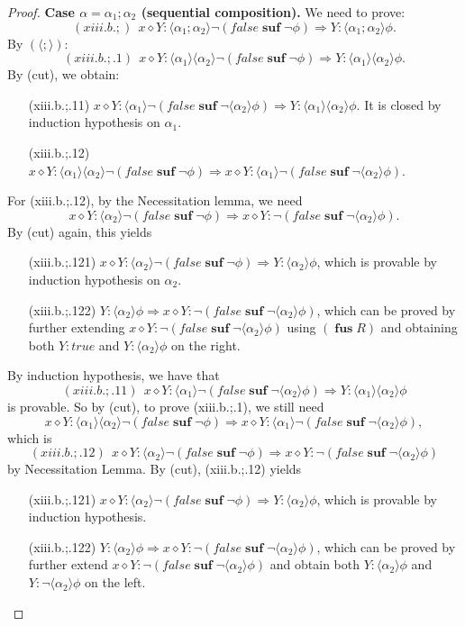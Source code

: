 \documentclass[manuscript,screen]{acmart}
\newcommand{\la}[0]{\langle}
\newcommand{\ra}[0]{\rangle}
\newcommand{\true}[0]{\mathit{true}}
\newcommand{\false}[0]{\mathit{false}}
\DeclareMathOperator{\seq}{;}
\newcommand{\cat}[0]{\diamond}
\DeclareMathOperator{\osuf}{\mathbf{suf}}
\DeclareMathOperator{\ofus}{\mathbf{fus}}
\begin{document}
\begin{proof}
\textbf{Case $\alpha = \alpha_1\seq\alpha_2$ (sequential composition).} 
We need to prove:
$$
(xiii.b.;)\ \ x\cat Y : \la\alpha_1\seq\alpha_2\ra\neg(\false\osuf\neg\phi)\Rightarrow Y : \la\alpha_1\seq\alpha_2\ra\phi. 
$$
By $(\la\seq\ra)$:
$$
(xiii.b.;.1)\ \ x\cat Y : \la\alpha_1\ra\la\alpha_2\ra\neg(\false\osuf\neg\phi)\Rightarrow Y : \la\alpha_1\ra\la\alpha_2\ra\phi. 
$$
By (cut), we obtain:
\begin{enumerate}
\item[(xiii.b.;.11)] $x\cat Y : \la\alpha_1\ra\neg(\false\osuf\neg\la\alpha_2\ra\phi)\Rightarrow Y : \la\alpha_1\ra\la\alpha_2\ra\phi$. It is closed by induction hypothesis on $\alpha_1$. 
\item[(xiii.b.;.12)] $x\cat Y : \la\alpha_1\ra\la\alpha_2\ra\neg(\false\osuf\neg\phi)\Rightarrow x\cat Y : \la\alpha_1\ra\neg(\false\osuf\neg\la\alpha_2\ra\phi)$. 
\end{enumerate}
For (xiii.b.;.12), by the Necessitation lemma, we need 
$$
x\cat Y : \la\alpha_2\ra\neg(\false\osuf\neg\phi)\Rightarrow x\cat Y : \neg(\false\osuf\neg\la\alpha_2\ra\phi).
$$
By (cut) again, this yields
\begin{enumerate}
\item[(xiii.b.;.121)] $x\cat Y : \la\alpha_2\ra\neg(\false\osuf\neg\phi)\Rightarrow Y : \la\alpha_2\ra\phi$, which is provable by induction hypothesis on $\alpha_2$. 
\item[(xiii.b.;.122)] $Y : \la\alpha_2\ra\phi\Rightarrow x\cat Y : \neg(\false\osuf\neg\la\alpha_2\ra\phi)$, which can be proved by further extending $x\cat Y : \neg(\false\osuf\neg\la\alpha_2\ra\phi)$ using $(\ofus R)$ and obtaining both $Y : \true$ and $Y : \la\alpha_2\ra\phi$ on the right. 
\end{enumerate}

\ifx
By induction hypothesis, we have that 
$$
(xiii.b.;.11)\ \ x\cat Y : \la\alpha_1\ra\neg(\false\osuf\neg\la\alpha_2\ra\phi)\Rightarrow Y : \la\alpha_1\ra\la\alpha_2\ra\phi
$$
is provable. 
So by (cut), to prove (xiii.b.;.1), we still need
$$
x\cat Y : \la\alpha_1\ra\la\alpha_2\ra\neg(\false\osuf\neg\phi)\Rightarrow x\cat Y : \la\alpha_1\ra\neg(\false\osuf\neg\la\alpha_2\ra\phi),  
$$
which is
$$
(xiii.b.;.12)\ \ x\cat Y : \la\alpha_2\ra\neg(\false\osuf\neg\phi)\Rightarrow x\cat Y : \neg(\false\osuf\neg\la\alpha_2\ra\phi)
$$
by Necessitation Lemma. 
By (cut), (xiii.b.;.12) yields 
\begin{enumerate}
\item[(xiii.b.;.121)] $x\cat Y : \la\alpha_2\ra\neg(\false\osuf\neg\phi)\Rightarrow Y : \la\alpha_2\ra\phi$, which is provable by induction hypothesis. 
\item[(xiii.b.;.122)] $Y : \la\alpha_2\ra\phi\Rightarrow x\cat Y : \neg(\false\osuf\neg\la\alpha_2\ra\phi)$, which can be proved by further extend $x\cat Y : \neg(\false\osuf\neg\la\alpha_2\ra\phi)$ and obtain both $Y : \la\alpha_2\ra\phi$ and $Y : \neg\la\alpha_2\ra\phi$ on the left. 
\end{enumerate}
\fi


\end{proof}
\end{document}
